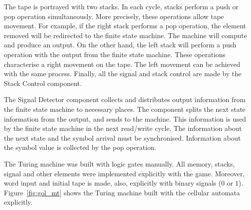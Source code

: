 \documentclass[12pt]{article}
\begin{document}
The tape is portrayed with two stacks. In each cycle, stacks perform a push or pop operation simultaneously. More precisely, these operations allow tape movement. For example, if the right stack performs a pop operation, the element removed will be redirected to the finite state machine. The machine will compute and produce an output. On the other hand, the left stack will perform a push operation with the output from the finite state machine. These operations characterise a right movement on the tape. The left movement can be achieved with the same process. Finally, all the signal and stack control are made by the Stack Control component.


The Signal Detector component collects and distributes output information from the finite state machine to necessary places. The component splits the next state information from the output, and sends to the machine. This information is used by the finite state machine in the next read/write cycle. The information about the next state and the symbol arrival must be synchronised. Information about the symbol value is collected by the pop operation.


The Turing machine was built with logic gates manually. All memory, stacks, signal and other elements were implemented explicitly with the game. Moreover, word input and initial tape is made, also, explicitly with binary signals ($0$ or $1$). Figure~\ref{fig:gol_mt} shows the Turing machine built with the cellular automata explicitly.
\end{document}

